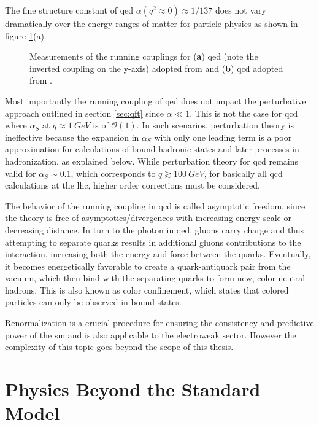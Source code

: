 The fine structure constant of \ac{qed} $\alpha(q^2\approx 0)\approx 1/137$ does not vary dramatically over the energy ranges of matter for particle physics as shown in figure \ref{fig:renorm_scaling_exp}(a).
\begin{figure}
    \centering
    \hspace{5mm}
    \caption[]{Measurements of the running couplings for (\textbf{a}) \ac{qed} (note the inverted coupling on the y-axis) adopted from \citep{opal2004tests} and (\textbf{b}) \ac{qcd} adopted from \citep{particle2022review}.}
    \label{fig:renorm_scaling_exp}
\end{figure}
Most importantly the running coupling of \ac{qed} does not impact the perturbative approach outlined in section \ref{sec:qft} since $\alpha\ll1$. This is not the case for \ac{qcd} where $\alpha_S$ at $q\approx\qty{1}{GeV}$ is of $\mathcal{O}(1)$. In such scenarios, perturbation theory is ineffective because the expansion in $\alpha_S$ with only one leading term is a poor approximation for calculations of bound hadronic states and later processes in hadronization, as explained below. While perturbation theory for \ac{qcd} remains valid for $\alpha_S\sim  0.1$, which corresponds to $q\gtrsim \qty{100}{GeV}$, for basically all \ac{qcd} calculations at the \ac{lhc}, higher order corrections must be considered.

The behavior of the running coupling in \ac{qcd} is called asymptotic freedom, since the theory is free of asymptotics/divergences with increasing energy scale or decreasing distance. In turn to the photon in \ac{qed}, gluons carry charge and thus attempting to separate quarks results in additional gluons contributions to the interaction, increasing both the energy and force between the quarks. Eventually, it becomes energetically favorable to create a quark-antiquark pair from the vacuum, which then bind with the separating quarks to form new, color-neutral hadrons. This is also known as color confinement, which states that colored particles can only be observed in bound states.

Renormalization is a crucial procedure for ensuring the consistency and predictive power of the \ac{sm} and is also applicable to the electroweak sector. However the complexity of this topic goes beyond the scope of this thesis.


\section{Physics Beyond the Standard Model}\label{sec:beyond_sm}

